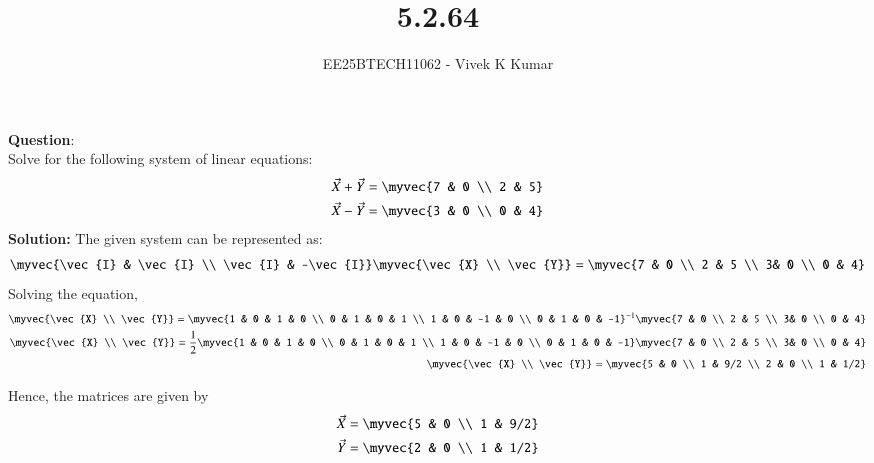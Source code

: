 \documentclass[journal]{IEEEtran}
\title{5.2.64}
\author{EE25BTECH11062 - Vivek K Kumar}
\begin{document}
\maketitle

\renewcommand{\thefigure}{\theenumi}
\renewcommand{\thetable}{\theenumi}


\textbf{Question}:\\
Solve for the following system of linear equations:
\begin{align*}
\vec{X} + \vec{Y} = \myvec{7 & 0 \\ 2 & 5}\\
\vec{X} - \vec{Y} = \myvec{3 & 0 \\ 0 & 4}\\
\end{align*}
\textbf{Solution: }
The given system can be represented as:
\begin{align}
    \myvec{\vec{I} & \vec{I} \\ \vec{I} & -\vec{I}}\myvec{\vec{X} \\ \vec{Y}} = \myvec{7 & 0 \\ 2 & 5 \\ 3& 0 \\ 0 & 4} 
\end{align}
Solving the equation,
\begin{align}
    \myvec{\vec{X} \\ \vec{Y}} = \myvec{1 & 0 & 1 & 0 \\ 0 & 1 & 0 & 1 \\ 1 & 0 & -1 & 0 \\ 0 & 1 & 0 & -1} ^{-1} \myvec{7 & 0 \\ 2 & 5 \\ 3& 0 \\ 0 & 4} \\
    \myvec{\vec{X} \\ \vec{Y}} = \frac{1}{2}\myvec{1 & 0 & 1 & 0 \\ 0 & 1 & 0 & 1 \\ 1 & 0 & -1 & 0 \\ 0 & 1 & 0 & -1} \myvec{7 & 0 \\ 2 & 5 \\ 3& 0 \\ 0 & 4} \\
    \myvec{\vec{X} \\ \vec{Y}} = \myvec{5 & 0 \\ 1 & 9/2 \\ 2 & 0 \\ 1 & 1/2}
\end{align}

Hence, the matrices are given by
\begin{align}
    \vec{X} = \myvec{5 & 0 \\ 1 & 9/2}\\
    \vec{Y} = \myvec{2 & 0 \\ 1 & 1/2}
\end{align}
\begin{table}[H]    
  \centering
  
  \caption{Results}
  \label{tab:5.2.64}
\end{table}
\end{document}

